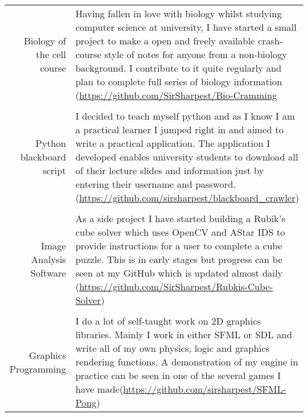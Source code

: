 \documentclass[a4paper,10pt]{article}
\begin{document}
\begin{tabular}{r|p{11cm}}

  Biology of the cell course  & Having fallen in love with biology whilst studying computer science at university, I have started a small project to make a open and freely available crash-course style of notes for anyone from a non-biology background. I contribute to it quite regularly and plan to complete full series of biology information (\href{https://github.com/SirSharpest/Bio-Cramming}{https://github.com/SirSharpest/Bio-Cramming}  \\
  \\
  Python blackboard script& I decided to teach myself python and as I know I am a practical learner I jumped right in and aimed to write a practical application. The application I developed enables university students to download all of their lecture slides and information just by entering their username and password.(\href{https://github.com/sirsharpest/blackboard\_crawler}{https://github.com/sirsharpest/blackboard\_crawler})\\
  \\
  Image Analysis Software& As a side project I have started building a Rubik's cube solver which uses OpenCV and AStar IDS to provide instructions for a user to complete a cube puzzle. This is in early stages but progress can be seen at my GitHub which is updated almost daily (\href{https://github.com/SirSharpest/Rubkis-Cube-Solver}{https://github.com/SirSharpest/Rubkis-Cube-Solver})\\
  \\
  Graphics Programming& I do a lot of self-taught work on 2D graphics libraries. Mainly I work in either SFML or SDL and write all of my own physics, logic and graphics rendering functions. A demonstration of my engine in practice can be seen in one of the several games I have made(\href{https://github.com/sirsharpest/SFML-Pong}{https://github.com/sirsharpest/SFML-Pong})
\end{tabular}
\par 
\clearpage
\end{document}
